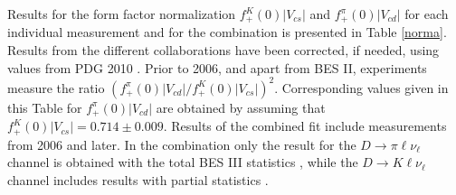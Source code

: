 
Results for the form factor normalization $f_+^K(0)|V_{cs}|$ and $f_+^{\pi}(0)|V_{cd}|$ for each individual measurement and for the combination 
is presented in Table \ref{norma}. Results from the different collaborations have been corrected, if needed, using
values from PDG 2010 \cite{Nakamura:2010zzi}. Prior to 2006, and apart from BES II, experiments measure the ratio $(f_+^{\pi}(0)|V_{cd}| / f_+^K(0)|V_{cs}|)^2$. 
Corresponding values given in this Table for $f_+^{\pi}(0)|V_{cd}|$ are obtained by assuming that $f_+^K(0)|V_{cs}|=0.714\pm 0.009$.
Results of the combined fit include measurements from 2006 and later. %
In the combination only the result for the $D \to \pi \ell \nu_\ell $ channel is obtained 
with the total BES III statistics \cite{BESIII-new}, while the $D \to K \ell \nu_\ell $ 
channel includes results with partial statistics \cite{BESIII}.\;

